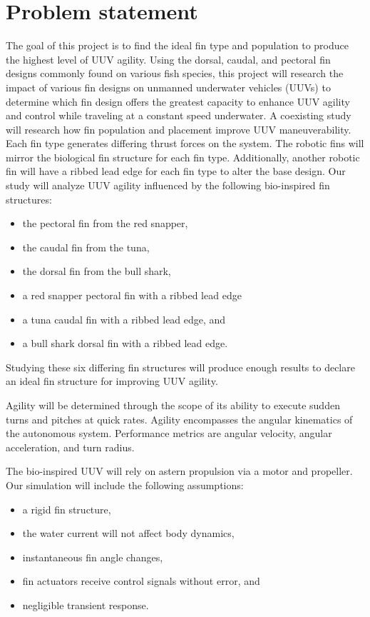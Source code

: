 \documentclass{IEEEtran}
\begin{document}
\section{Problem statement}
The goal of this project is to find the ideal fin type and population to produce the highest level of UUV agility.  Using the dorsal, caudal, and pectoral fin designs commonly found on various fish species, this project will research the impact of various fin designs on unmanned underwater vehicles (UUVs) to determine which fin design offers the greatest capacity to enhance UUV agility and control while traveling at a constant speed underwater.   A coexisting study will research how fin population and placement improve UUV maneuverability.   Each fin type generates differing thrust forces on the system.  The robotic fins will mirror the biological fin structure for each fin type. Additionally, another robotic fin will have a ribbed lead edge for each fin type to alter the base design.  Our study will analyze UUV agility influenced by the following bio-inspired fin structures:
\begin{itemize}
\item the pectoral fin from the red snapper,
\item the caudal fin from the tuna, 
\item the dorsal fin from the bull shark,
\item a red snapper pectoral fin with a ribbed lead edge
\item a tuna caudal fin with a ribbed lead edge, and
\item a bull shark dorsal fin with a ribbed lead edge.  
\end{itemize}
Studying these six differing fin structures will produce enough results to declare an ideal fin structure for improving UUV agility.   

Agility will be determined through the scope of its ability to execute sudden turns and pitches at quick rates.  Agility encompasses the angular kinematics of the autonomous system.  Performance metrics are angular velocity, angular acceleration, and turn radius.

The bio-inspired UUV will rely on astern propulsion via a motor and propeller. Our simulation will include the following assumptions:
\begin{itemize}
\item a rigid fin structure,  
\item the water current will not affect body dynamics,  
\item instantaneous fin angle changes,
\item fin actuators receive control signals without error, and
\item negligible transient response.
\end{itemize}
\end{document}
